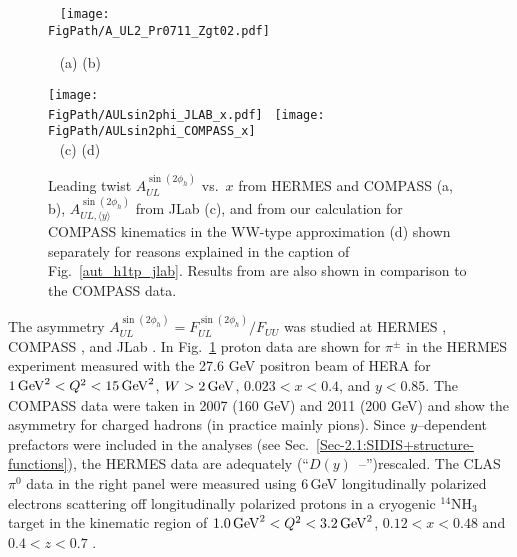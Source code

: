 \documentclass[a4paper,11pt]{article}
\newcommand*{\FigPath}{./figs}%
\begin{document}
\begin{figure}
\centering \ \hspace{-6mm}
\texttt{[image: \\FigPath/A\_UL2\_Pr0711\_Zgt02.pdf]} \\

\vspace{-0.5cm}

\ \hspace{1cm} {\tiny (a)} \hspace{6cm} {\tiny (b)} 

\vspace{1cm}

\texttt{[image: \\FigPath/AULsin2phi\_JLAB\_x.pdf]} \
\texttt{[image: \\FigPath/AULsin2phi\_COMPASS\_x]} \\
\ \hspace{1cm} {\tiny (c)} \hspace{6cm} {\tiny (d)}
	\caption{\label{aul_jlab}
	Leading twist $A_{UL}^{\sin(2\phi_h)}$ vs.~$x$ from
	HERMES \cite{Airapetian:1999tv} and 
	COMPASS \cite{Parsamyan:2018ovx,Parsamyan:2018evv} (a, b),
	$A_{UL,  \langle y\rangle}^{\sin(2\phi_h)}$ from
	JLab \cite{Jawalkar:2017ube} (c),  and from our calculation 
	for COMPASS kinematics in the WW-type approximation (d)
	shown separately for reasons explained in the
	caption of Fig.~\ref{aut_h1tp_jlab}. Results
	from \cite{Avakian:2007mv} are also shown in comparison to the 
	COMPASS data.}
\end{figure}

The asymmetry $A_{UL}^{\sin(2\phi_h)}=F_{UL}^{\sin(2\phi_h)}/F_{UU}$  was
studied at HERMES \cite{Airapetian:1999tv,Airapetian:2002mf}, COMPASS
\cite{Parsamyan:2018ovx,Parsamyan:2018evv}, and JLab \cite{Avakian:2010ae,Jawalkar:2017ube}.
In Fig.~\ref{aul_jlab} proton data are shown for $\pi^\pm$ in the
HERMES experiment measured with the 27.6 GeV positron
beam of HERA for
$1\,{\rm GeV}^2 < Q^2 < 15 \,{\rm GeV}^2$, $W > 2\,{\rm GeV}$,
$0.023 < x < 0.4$, and $y < 0.85$.
The COMPASS data were taken in 2007 (160 GeV) and 2011 (200 GeV) and show
the asymmetry for charged hadrons (in practice mainly pions).
Since $y$--dependent prefactors were included in the analyses
(see Sec.~\ref{Sec-2.1:SIDIS+structure-functions}),
the HERMES data are adequately (``$D(y)$~--'')rescaled.
The CLAS $\pi^0$ data in the right panel were measured using 6$\,$GeV
longitudinally polarized electrons scattering off
longitudinally polarized protons in a cryogenic $^{14}$NH$_3$
target in the kinematic region of $1.0\,{\rm GeV}^2 < Q^2 < 3.2\,{\rm GeV}^2$,
$0.12 < x < 0.48$ and $0.4 < z < 0.7$ \cite{Jawalkar:2017ube}.
\end{document}
